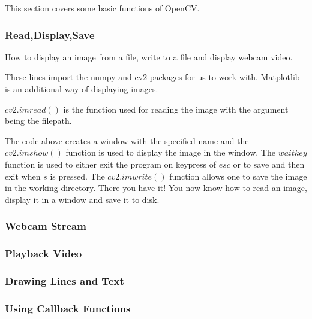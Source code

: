 This section covers some basic functions of OpenCV.
\subsubsection{Read,Display,Save}
How to display an image from a file, write to a file and display webcam video.

These lines import the numpy and cv2 packages for us to work with. Matplotlib is an additional way of displaying images.

$cv2.imread()$ is the function used for reading the image with the argument being the filepath.

The code above creates a window with the specified name and the $cv2.imshow()$ function is used to display the image in the window.
The $waitkey$ function is used to either exit the program on keypress of $esc$ or to save and then exit when $s$ is pressed. The $cv2.imwrite()$ function allows one to save the image in the working directory.
There you have it! You now know how to read an image, display it in a window and save it to disk.
\subsubsection{Webcam Stream}

\subsubsection{Playback Video}

\subsubsection{Drawing Lines and Text}

\subsubsection{Using Callback Functions}
